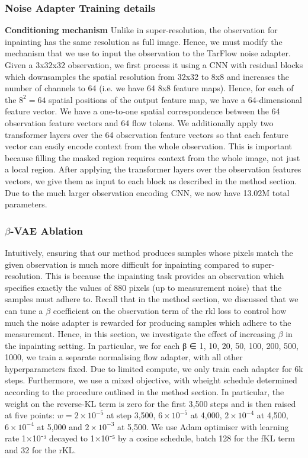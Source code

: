 \documentclass[12pt,a4paper]{report}
\begin{document}
\subsubsection{Noise Adapter Training details}
\textbf{Conditioning mechanism}
Unlike in super-resolution, the observation for inpainting has the same resolution as full image. 
Hence, we must modify the mechanism that we use to input the observation to the TarFlow noise adapter. 
Given a 3x32x32 observation, we first process it using a CNN with residual blocks which downsamples the spatial resolution from 32x32 to 8x8 and increases the number of channels to 64 (i.e. we have 64 8x8 feature maps). 
Hence, for each of the $8^2=64$ spatial positions of the output feature map, we have a 64-dimensional feature vector. 
We have a one-to-one spatial correspondence between the 64 observation feature vectors and 64 flow tokens. 
We additionally apply two transformer layers over the 64 observation feature vectors so that each feature vector can easily encode context from the whole observation. 
This is important because filling the masked region requires context from the whole image, not just a local region. 
After applying the transformer layers over the observation features vectors, we give them as input to each block as described in the method section. 
Due to the much larger observation encoding CNN, we now have 13.02M total parameters. 


\subsubsection{$\beta$-VAE Ablation}
Intuitively, ensuring that our method produces samples whose pixels match the given observation is much more difficult for inpainting compared to super-resolution. 
This is because the inpainting task provides an observation which specifies exactly the values of 880 pixels (up to measurement noise) that the samples must adhere to. 
Recall that in the method section, we discussed that we can tune a $\beta$ coefficient on the observation term of the rkl loss to control how much the noise adapter is rewarded for producing samples which adhere to the measurement. 
Hence, in this section, we investigate the effect of increasing $\beta$ in the inpainting setting. 
In particular, we for each β ∈ {1, 10, 20, 50, 100, 200, 500, 1000}, we train a separate normalising flow adapter, with all other hyperparameters fixed. 
Due to limited compute, we only train each adapter for 6k steps.
Furthermore, we use a mixed objective, with wheight schedule determined according to the procedure outlined in the method section. 
In particular, the weight on the reverse-KL term is zero for the first 3,500 steps and is then raised at five points: $w = 2\times10^{-5}$ at step 3,500, $6\times10^{-5}$ at 4,000, $2\times10^{-4}$ at 4,500, $6\times10^{-4}$ at 5,000 and $2\times10^{-3}$ at 5,500. 
We use Adam optimiser with learning rate 1×10⁻³ decayed to 1×10⁻⁵ by a cosine schedule, batch 128 for the fKL term and 32 for the rKL. 
\end{document}
